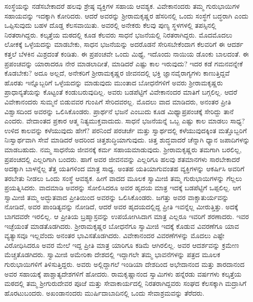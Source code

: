  ಸಂಸ್ಥೆಯನ್ನು ನಡೆಸಬೇಕಾದರೆ ಹಲವು ಶ್ರೇಷ್ಠ ವ್ಯಕ್ತಿಗಳ ಸಹಾಯ ಆವಶ್ಯಕ. ವಿವೇಕಾನಂದರು ತಮ್ಮ ಗುರುಭಾಯಿಗಳ ಸಹಾಯವನ್ನು ಇದಕ್ಕಾಗಿ ಕೋರಿದರು. ಆದರೆ ಅವರನ್ನು ಶ‍್ರೀರಾಮಕೃಷ್ಣರ ಹೆಸರಿನಲ್ಲಿ ಒಂದು ಸಂಸ್ಥೆಗೆ ಬದ್ಧರಾಗಿ ಎಂದು ಒಪ್ಪಿಸುವುದು ಬಹಳ ದೊಡ್ಡ ಕೆಲಸವಾಯಿತು. ಅವರಲ್ಲಿ ಅನೇಕರು ಕೆಲವು ಪುಣ್ಯ ಸ್ಥಳಗಳಲ್ಲಿ ತಪಸ್ಸಿನಲ್ಲಿ ನಿರತರಾಗಿದ್ದರು. ಕಲ್ಕತ್ತೆಯ ಮಠದಲ್ಲಿ ಕೂಡ ಕೆಲವರು ಸಾಧನೆ ಭಜನೆಯಲ್ಲಿ ನಿರತರಾಗಿದ್ದರು. ಮೊದಮೊದಲು ಲೋಕಕ್ಕೆ ಒಳ್ಳೆಯದನ್ನು ಮಾಡಬೇಕು, ಸಾಧನ ಭಜನೆಯನ್ನು ಅದರೊಡನೆ ಸೇರಿಸಬೇಕೆಂದಾಗ ಕೆಲವರಿಗೆ ಈ ಆದರ್ಶ ಕತ್ತಲೆ ಬೆಳಕಿನ ಮಿಶ್ರದಂತೆ ಕಂಡಿತು. ಈ ಪ್ರಪಂಚವೇ ಒಂದು ಮಿಥ್ಯೆ, ಇದೊಂದು ನಾಯಿಯ ಡೊಂಕು ಬಾಲದಂತೆ. ಈ ಪ್ರಪಂಚವನ್ನು ಯಾರಾದರೂ ನೇರ ಮಾಡಲಾದೀತೆ, ಮಾಡಿದರೆ ಎಷ್ಟು ಕಾಲ ಇರುವುದು? ಇದರ ಕಡೆ ಗಮನವನ್ನೇಕೆ ಕೊಡಬೇಕು? ಅದೂ ಅಲ್ಲದೆ, ಅನೇಕರಿಗೆ ಶ‍್ರೀರಾಮಕೃಷ್ಣರ ಜೀವನದಲ್ಲಿ ಭಕ್ತಿ ಜ್ಞಾನವೈರಾಗ್ಯಗಳು ಕಾಣುತ್ತಿದ್ದವೆ ಹೊರತು ಇನ್ನೊಬ್ಬರಿಗೆ ಒಳ್ಳೆಯದನ್ನು ಮಾಡುವುದು ಮುಂತಾದ ಬೋಧನೆಗಳಿಗೆ ಅವರು ಶ‍್ರೀರಾಮಕೃಷ್ಣರು ಪ್ರಾಧಾನ್ಯತೆಯನ್ನು ಕೊಟ್ಟಂತೆ ಕಂಡುಬರುವುದಿಲ್ಲ. ಅವರು ಬಡಪೆಟ್ಟಿಗೆ ವಿವೇಕಾನಂದರ ಮಾತಿಗೆ ಬಗ್ಗಲಿಲ್ಲ. ಆದರೆ ವಿವೇಕಾನಂದರು ಸುಮ್ಮನೆ ಬಿಡುವವರ ಗುಂಪಿಗೆ ಸೇರಿದವರಲ್ಲ. ಮೊದಲು ವಾದ ಮಾಡಿದರು, ಅನಂತರ ಪ್ರೀತಿ ವಿಶ್ವಾಸದಿಂದ ಅವರನ್ನು ಒಲಿಸಿಕೊಂಡರು. ಪ್ರಾರ್ಥನೆ ಭಜನೆ ಎಂಬುದು ಕೂಡ ಮಿಥ್ಯಾಪ್ರಪಂಚಕ್ಕೆ ಸೇರಿದ್ದು ತಾನೆ ಎಂದರು. ವೇದಾಂತದ ಪ್ರಕಾರ ಆತ್ಮ ನಿತ್ಯಮುಕ್ತವಾದುದು. ಸಾಧನೆ ಭಜನೆಯನ್ನೆ ಒಬ್ಬ ಎಷ್ಟು ಕಾಲ ಮಾಡಲು ಸಾಧ್ಯ? ಉಳಿದ ಕಾಲವನ್ನು ಕಳೆಯುವುದು ಹೇಗೆ? ಪರನಿಂದೆ ಪರಚರ್ಚೆ ಮತ್ತು ಸ್ವಾರ್ಥದಲ್ಲಿ ಕಳೆಯುವುದಕ್ಕಿಂತ ಮತ್ತೊಬ್ಬರಿಗೆ ನಿಃಸ್ವಾರ್ಥವಾಗಿ ಸೇವೆ ಮಾಡಿದರೆ ಅದರಿಂದ ಚಿತ್ತಶುದ್ಧಿಯಾಗುವುದು. ಚಿತ್ತ ಶುದ್ಧವಾದರೆ ಚೆನ್ನಾಗಿ ಧ್ಯಾನ ಜಪಾದಿಗಳನ್ನು ಮಾಡಬಹುದು. ನಮ್ಮ ಸಾಧನೆಯ ಜೀವನಕ್ಕೆ ಕರ್ಮ ಸಹಾಯಮಾಡುವುದು. ಶ‍್ರೀರಾಮಕೃಷ್ಣರು ತಮಗಾಗಿ ಬರಲಿಲ್ಲ, ಪ್ರಪಂಚದಲ್ಲಿ ಎಲ್ಲರಿಗಾಗಿ ಬಂದರು. ಹಾಗೆ ಅವರ ಜೀವನವನ್ನು ಎಲ್ಲರಿಗೂ ಹಲವು ಶತಮಾನಗಳು ಸಾರಬೇಕಾದರೆ ಅದಕ್ಕಾಗಿ ಬಾಳನ್ನೆಲ್ಲ ತೆತ್ತ ಯತಿಗಳಿಂದ ಮಾತ್ರ ಸಾಧ್ಯ. ಅಂತಹ ಯತಿಯಾಗುವಂತಹ ವ್ಯಕ್ತಿಗಳನ್ನು ಆಕರ್ಷಿಸಿ ಅವರಿಗೆ ತರಬೇತು ನೀಡಲು ಒಂದು ಸಂಸ್ಥೆ ಆವಶ್ಯಕ. ಹೀಗೆ ವಾದದ ಮೂಲಕ ಸ್ವಾಮೀಜಿ ತಮ್ಮ ಗುರುಭಾಯಿಗಳನ್ನು ಗೆಲ್ಲಲು ಪ್ರಯತ್ನಿಸಿದರು. ವಾದಮಾಡಿ ಅವರನ್ನು ಸೋಲಿಸಿದರೂ ಅವರ ಹೃದಯ ಮಾತ್ರ ಇದಕ್ಕೆ ಬಡಪೆಟ್ಟಿಗೆ ಒಪ್ಪಲಿಲ್ಲ. ಆಗ ಸ್ವಾಮೀಜಿ ತಮ್ಮ ಅದ್ಭುತವಾದ ಪ್ರೀತಿಯಿಂದ ಅವರನ್ನು ಒಲಿಸಿಕೊಂಡರು. ಜಗತ್ತು ಅವರ ವಾಕ್ಚಾತುರ್ಯವನ್ನು ನೋಡಿದೆ, ಅವರ ಪಾಂಡಿತ್ಯವನ್ನು ನೋಡಿದೆ, ಆದರೆ ಅವರ ಹೃದಯದಲ್ಲಿದ್ದ ಪ್ರೀತಿ ಇವನ್ನೆಲ್ಲ ಮೀರುತ್ತಿತ್ತು. ಅದಕ್ಕೆ ಬಾಗದವರೇ ಇರಲಿಲ್ಲ. ಆ ಪ್ರೀತಿಯ ಬ್ರಹ್ಮಾಸ್ರವನ್ನು ಉಪಯೋಗಿಸಿದಾಗ ಮಾತ್ರ ಎಲ್ಲರೂ ಇವರಿಗೆ ಶರಣಾದರು. ಇವರ ಇಚ್ಛೆಯಂತೆ ಮಾಡತೊಡಗಿದರು. ಶ‍್ರೀರಾಮಕೃಷ್ಣರ ಬೋಧನೆಗೂ ಸ್ವಾಮೀಜಿ ಇದಕ್ಕೆ ಕೊಡುವ ವಿವರಣೆಗೂ ಯಾವ ವ್ಯತ್ಯಾಸವೂ ಇಲ್ಲವೆಂದು ಅನಂತರ ಭಾವಿಸತೊಡಗಿದರು. ವಿವೇಕಾನಂದರ ವಿವರಣೆಗಳನ್ನು ಮೊದಲು ಎಷ್ಟೇ ವಿರೋಧಿಸಿದರೂ ಅವರ ಮೇಲೆ ಇದ್ದ ಪ್ರೀತಿ ಮಾತ್ರ ಯಾರಿಗೂ ಕಡಿಮೆ ಆಗಿರಲಿಲ್ಲ. ಅವರ ಆದರ್ಶವನ್ನು ಕ್ರಮೇಣ ಮೆಚ್ಚತೊಡಗಿದರು. ಸ್ವಾಮೀಜಿ ಅಮೇರಿಕಾ ದೇಶದಲ್ಲಿ ಇದ್ದಾಗಲೇ ತಮ್ಮ ಭಾವನೆಗಳನ್ನು ಪತ್ರದ ಮೂಲಕ ಗುರುಭಾಯಿಗಳಿಗೆ ತಿಳಿಸುತ್ತಿದ್ದರು. ಅವರು ಅಲ್ಲಿದ್ದಾಗಲೆ ಇಂಡಿಯಾ ದೇಶದಿಂದ ಅಭೇದಾನಂದ ಮತ್ತು ಶಾರದಾನಂದ ಅವರ ಸಹಾಯಕ್ಕೆ ಪಾಶ್ಚಾತ್ಯದೇಶಗಳಿಗೆ ಹೋದರು. ರಾಮಕೃಷ್ಣಾನಂದ ಸ್ವಾಮಿಗಳು ಹನ್ನೆರಡು ವರ್ಷಗಳು ಕಲ್ಕತ್ತೆಯ ಮಠದಲ್ಲಿ ತಮ್ಮ ಶ‍್ರೀಗುರುದೇವರ ಪೂಜೆ ಮತ್ತು ಸೇವಾಕಾರ್ಯದಲ್ಲಿ ನಿರತರಾಗಿದ್ದವರು ಸಂಘದ ಕೆಲಸಕ್ಕಾಗಿ ಮದ್ರಾಸಿಗೆ ಹೊರಟುಬಂದರು. ಅಖಂಡಾನಂದರು ಮುರ್ಷಿದಾಬಾದಿನಲ್ಲಿ ಒಂದು ಸೇವಾಶ್ರಮವನ್ನು ತೆರೆದರು. 

